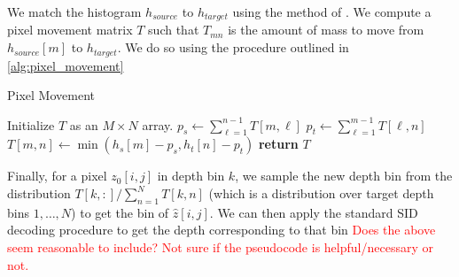 We match the histogram $h_{source}$ to $h_{target}$ using the method of
\cite{Morovic2002}. We compute a pixel movement
matrix $T$ such that $T_{mn}$ is the amount of mass to move from $h_{source}[m]$
to $h_{target}$. We do so using the procedure outlined in \ref{alg:pixel_movement}

\begin{algorithm}[H]
 \caption{Pixel Movement} 
 \label{alg:ehm}
 \begin{algorithmic}
    \State Initialize $T$ as an $M \times N$ array.
        \State $p_s \gets \sum_{\ell=1}^{n-1} T[m, \ell]$
        \State $p_t \gets \sum_{\ell=1}^{m-1} T[\ell, n]$
        \State $T[m, n] \gets \min(h_s[m] - p_s, h_t[n] - p_t)$
      \EndFor
    \EndFor
    \State \textbf{return} $T$
  \EndProcedure
 \end{algorithmic}
\end{algorithm}

Finally, for a pixel $z_0[i, j]$ in depth bin $k$, we sample the new depth bin from the
distribution $T[k, :]/\sum_{n=1}^NT[k,n]$ (which is a distribution over target
depth bins $1,\ldots,N$) to get the bin of $\hat z[i,j]$. We can then apply the
standard SID decoding procedure to get the depth corresponding to that bin
\textcolor{red}{Does the above seem reasonable to include? Not sure if the
  pseudocode is helpful/necessary or not.}


